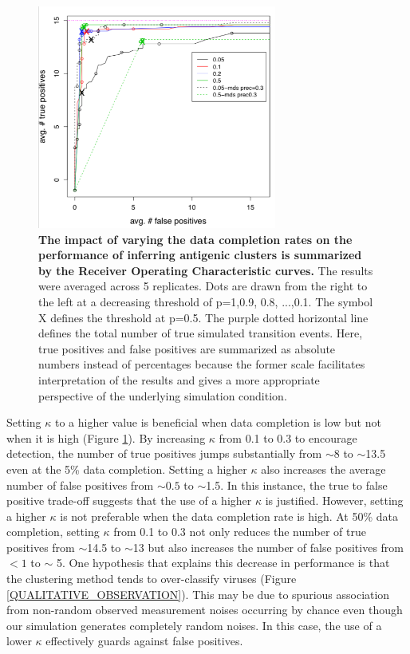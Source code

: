 \documentclass[11pt,oneside,letterpaper]{article}
\begin{document}
\begin{figure}[h]
	\centering		
	\includegraphics[width=0.7\textwidth]{figures/custom/ROC-simulation}
	\caption{\textbf{The impact of varying the data completion rates on the performance of inferring antigenic clusters is summarized by the Receiver Operating Characteristic curves.} 
 The results were averaged across 5 replicates.	
 Dots are drawn from the right to the left at a decreasing threshold of p=1,0.9, 0.8, ...,0.1. 
 The symbol X defines the threshold at p=0.5. 
The purple dotted horizontal line defines the total number of true simulated transition events. 
Here, true positives and false positives are summarized as absolute numbers instead of percentages because the former scale facilitates interpretation of the results and gives a more appropriate perspective of the underlying simulation condition.
	 		} 
	
	\label{ROCSimulation} 
\end{figure}






Setting $\kappa$ to a higher value is beneficial when data completion is low but not when it is high (Figure \ref{ROCSimulation}). 
By increasing $\kappa$ from 0.1 to 0.3 to encourage detection, the number of true positives jumps substantially from $\sim8$ to $\sim$13.5 even at the 5\% data completion. 
Setting a higher $\kappa$ also increases the average number of false positives from $\sim0.5$ to $\sim$1.5. 
In this instance, the true to false positive trade-off suggests that the use of a higher $\kappa$ is justified. 
However, setting a higher $\kappa$ is not preferable when the data completion rate is high. 
At 50\% data completion, setting $\kappa$ from 0.1 to 0.3 not only reduces the number of true positives from $\sim$14.5 to $\sim$13 but also increases the number of false positives from $<1$ to $\sim$ 5. 
One hypothesis that explains this decrease in performance is that the clustering method tends to over-classify viruses (Figure \ref{QUALITATIVE_OBSERVATION}).
This may be due to  spurious association from non-random observed measurement noises occurring by chance even though our simulation generates completely random noises. 
In this case, the use of a lower $\kappa$ effectively guards against false positives.
\end{document}

